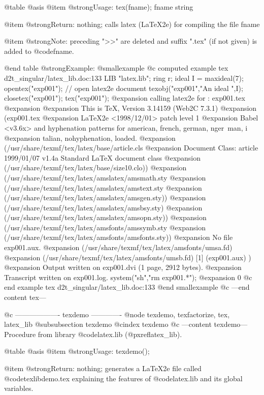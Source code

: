 {@table @asis
@item @strong{Usage:}
tex(fname); fname string

@item @strong{Return:}
nothing; calls latex (LaTeX2e) for compiling the file fname

@item @strong{Note:}
preceding ">>" are deleted and suffix ".tex" (if not given)
is added to @code{fname}.

@end table
@strong{Example:}
@smallexample
@c computed example tex d2t_singular/latex_lib.doc:133 
LIB "latex.lib";
ring r;
ideal I = maxideal(7);
opentex("exp001");              // open latex2e document
texobj("exp001","An ideal ",I);
closetex("exp001");
tex("exp001"); 
@expansion{} calling  latex2e  for : exp001.tex 
@expansion{} 
@expansion{} This is TeX, Version 3.14159 (Web2C 7.3.1)
@expansion{} (exp001.tex
@expansion{} LaTeX2e <1998/12/01> patch level 1
@expansion{} Babel <v3.6x> and hyphenation patterns for american, french, german, nger\
   man, i
@expansion{} talian, nohyphenation, loaded.
@expansion{} (/usr/share/texmf/tex/latex/base/article.cls
@expansion{} Document Class: article 1999/01/07 v1.4a Standard LaTeX document class
@expansion{} (/usr/share/texmf/tex/latex/base/size10.clo))
@expansion{} (/usr/share/texmf/tex/latex/amslatex/amsmath.sty
@expansion{} (/usr/share/texmf/tex/latex/amslatex/amstext.sty
@expansion{} (/usr/share/texmf/tex/latex/amslatex/amsgen.sty))
@expansion{} (/usr/share/texmf/tex/latex/amslatex/amsbsy.sty)
@expansion{} (/usr/share/texmf/tex/latex/amslatex/amsopn.sty))
@expansion{} (/usr/share/texmf/tex/latex/amsfonts/amssymb.sty
@expansion{} (/usr/share/texmf/tex/latex/amsfonts/amsfonts.sty))
@expansion{} No file exp001.aux.
@expansion{} (/usr/share/texmf/tex/latex/amsfonts/umsa.fd)
@expansion{} (/usr/share/texmf/tex/latex/amsfonts/umsb.fd) [1] (exp001.aux) )
@expansion{} Output written on exp001.dvi (1 page, 2912 bytes).
@expansion{} Transcript written on exp001.log.
system("sh","rm exp001.*");
@expansion{} 0
@c end example tex d2t_singular/latex_lib.doc:133
@end smallexample
@c ---end content tex---

@c ------------------- texdemo -------------
@node texdemo, texfactorize, tex, latex_lib
@subsubsection texdemo
@cindex texdemo
@c ---content texdemo---
Procedure from library @code{latex.lib} (@pxref{latex_lib}).

@table @asis
@item @strong{Usage:}
texdemo();

@item @strong{Return:}
nothing; generates a LaTeX2e file called @code{texlibdemo.tex}
explaining the features of @code{latex.lib} and its global variables.

}
